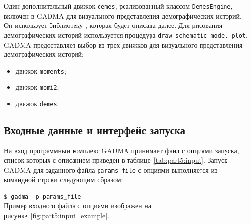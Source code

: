 Один дополнительный движок \texttt{demes}, реализованный классом \texttt{DemesEngine}, включен в GADMA для визуального представления демографических историй.
Он использует библиотеку \demes, которая будет описана далее.
Для рисования демографических историй используется процедура \texttt{draw\_schematic\_model\_plot}.
GADMA предоставляет выбор из трех движков для визуального представления демографических историй:
\begin{itemize}
    \item движок \texttt{moments};
    \item движок \texttt{momi2};
    \item движок \texttt{demes}.
\end{itemize}

\subsection{Входные данные и интерфейс запуска}

На вход программный комплекс GADMA принимает файл с опциями запуска, список которых с описанием приведен в таблице~\ref{tab:part5:input}.
Запуск GADMA для заданного файла \texttt{params\_file} с опциями выполняется из командной строки следующим образом:

\texttt{\$ gadma -p params\_file}\\

Пример входного файла с опциями изображен на рисунке~\ref{fig:part5:input_example}.

